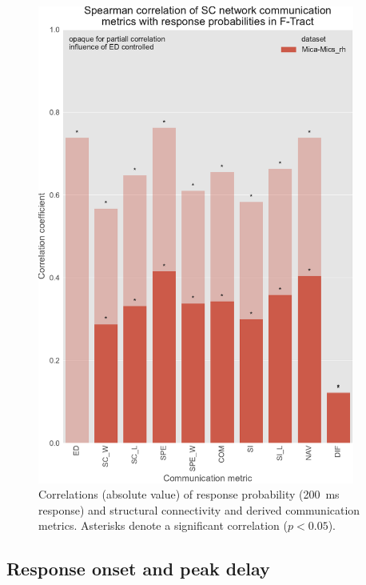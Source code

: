 \begin{figure}
    \centering
    \includegraphics[width=0.93\textwidth]{images/nootebook_generated/ftract_results/MNI-HCP-MMP1/5/ED0/0.25/long/mica_rhSpearman_correlation_of_SC_network_communication_metrics_with_response_probabilities_in_F-Tract.pdf}
    \caption[F-TRACT probability correlations - Mica-Mics\_rh 200 ms]{Correlations (absolute value) of response probability (200~ms response) and structural connectivity and derived communication metrics. Asterisks denote a significant correlation ($p<0.05$).}
    \label{fig:ftract_mica_long_probabilities}
\end{figure}

\subsection{Response onset and peak delay}

